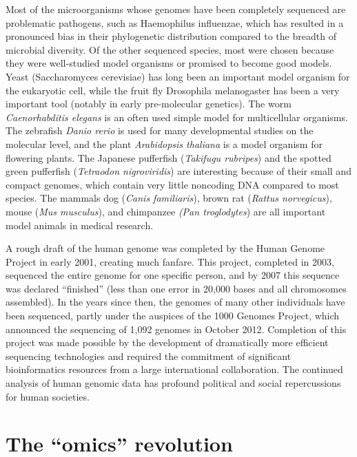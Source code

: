 Most of the microorganisms whose genomes have been completely sequenced are problematic pathogens, such as Haemophilus influenzae, which has resulted in a pronounced bias in their phylogenetic distribution compared to the breadth of microbial diversity. Of the other sequenced species, most were chosen because they were well-studied model organisms or promised to become good models. Yeast (Saccharomyces cerevisiae) has long been an important model organism for the eukaryotic cell, while the fruit fly Drosophila melanogaster has been a very important tool (notably in early pre-molecular genetics). The worm \emph{Caenorhabditis elegans} is an often used simple model for multicellular organisms. The zebrafish \emph{Danio rerio} is used for many developmental studies on the molecular level, and the plant \emph{Arabidopsis thaliana} is a model organism for flowering plants. The Japanese pufferfish (\emph{Takifugu rubripes}) and the spotted green pufferfish (\emph{Tetraodon nigroviridis}) are interesting because of their small and compact genomes, which contain very little noncoding DNA compared to most species. The mammals dog (\emph{Canis familiaris}), brown rat (\emph{Rattus norvegicus}), mouse (\emph{Mus musculus}), and chimpanzee \emph{(Pan troglodytes}) are all important model animals in medical research.

A rough draft of the human genome was completed by the Human Genome Project in early 2001, creating much fanfare. This project, completed in 2003, sequenced the entire genome for one specific person, and by 2007 this sequence was declared ``finished'' (less than one error in 20,000 bases and all chromosomes assembled). In the years since then, the genomes of many other individuals have been sequenced, partly under the auspices of the 1000 Genomes Project, which announced the sequencing of 1,092 genomes in October 2012. Completion of this project was made possible by the development of dramatically more efficient sequencing technologies and required the commitment of significant bioinformatics resources from a large international collaboration. The continued analysis of human genomic data has profound political and social repercussions for human societies.

\hypertarget{the-omics-revolution}{%
\section{The ``omics'' revolution}\label{the-omics-revolution}}

